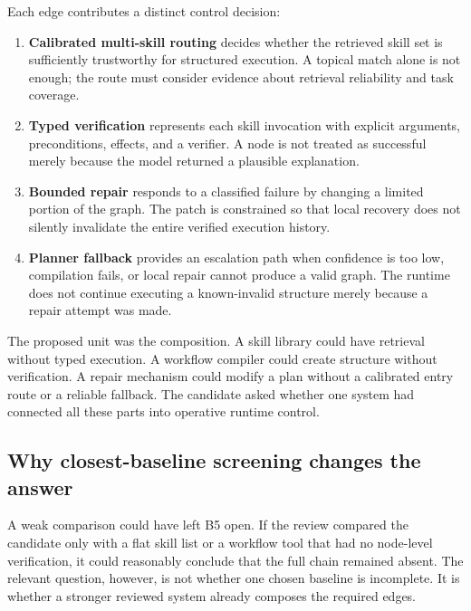 Each edge contributes a distinct control decision:

\begin{enumerate}
  \item \textbf{Calibrated multi-skill routing} decides whether the retrieved skill set is sufficiently trustworthy for structured execution. A topical match alone is not enough; the route must consider evidence about retrieval reliability and task coverage.
  \item \textbf{Typed verification} represents each skill invocation with explicit arguments, preconditions, effects, and a verifier. A node is not treated as successful merely because the model returned a plausible explanation.
  \item \textbf{Bounded repair} responds to a classified failure by changing a limited portion of the graph. The patch is constrained so that local recovery does not silently invalidate the entire verified execution history.
  \item \textbf{Planner fallback} provides an escalation path when confidence is too low, compilation fails, or local repair cannot produce a valid graph. The runtime does not continue executing a known-invalid structure merely because a repair attempt was made.
\end{enumerate}

The proposed unit was the composition. A skill library could have retrieval without typed execution. A workflow compiler could create structure without verification. A repair mechanism could modify a plan without a calibrated entry route or a reliable fallback. The candidate asked whether one system had connected all these parts into operative runtime control.


\subsection{Why closest-baseline screening changes the answer}

A weak comparison could have left B5 open. If the review compared the candidate only with a flat skill list or a workflow tool that had no node-level verification, it could reasonably conclude that the full chain remained absent. The relevant question, however, is not whether one chosen baseline is incomplete. It is whether a stronger reviewed system already composes the required edges.

